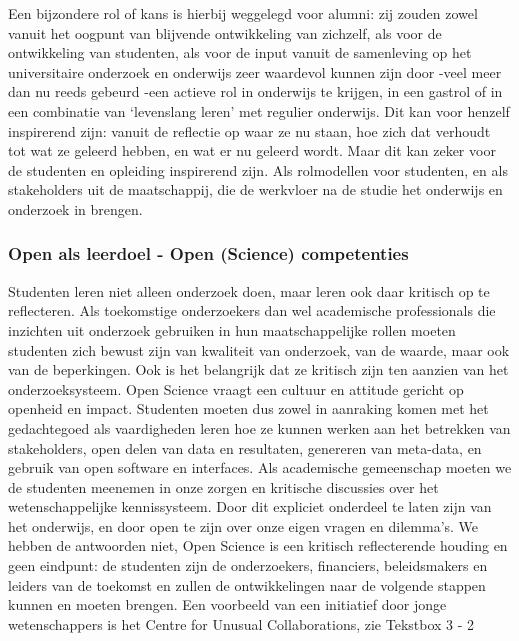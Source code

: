 \documentclass{jote-book}
\begin{document}
	Een bijzondere rol of kans is hierbij weggelegd voor alumni: zij zouden zowel vanuit het oogpunt van blijvende ontwikkeling van zichzelf, als voor de ontwikkeling van studenten, als voor de input vanuit de samenleving op het universitaire onderzoek en onderwijs zeer waardevol kunnen zijn door -veel meer dan nu reeds gebeurd -een actieve rol in onderwijs te krijgen, in een gastrol of in een combinatie van ‘levenslang leren' met regulier onderwijs. Dit kan voor henzelf inspirerend zijn: vanuit de reflectie op waar ze nu staan, hoe zich dat verhoudt tot wat ze geleerd hebben, en wat er nu geleerd wordt. Maar dit kan zeker voor de studenten en opleiding inspirerend zijn. Als rolmodellen voor studenten, en als stakeholders uit de maatschappij, die de werkvloer na de studie het onderwijs en onderzoek in brengen.



	\subsubsection{Open als leerdoel - Open (Science) competenties}



	Studenten leren niet alleen onderzoek doen, maar leren ook daar kritisch op te reflecteren. Als toekomstige onderzoekers dan wel academische professionals die inzichten uit onderzoek gebruiken in hun maatschappelijke rollen moeten studenten zich bewust zijn van kwaliteit van onderzoek, van de waarde, maar ook van de beperkingen. Ook is het belangrijk dat ze kritisch zijn ten aanzien van het onderzoeksysteem. Open Science vraagt een cultuur en attitude gericht op openheid en impact. Studenten moeten dus zowel in aanraking komen met het gedachtegoed als vaardigheden leren hoe ze kunnen werken aan het betrekken van stakeholders, open delen van data en resultaten, genereren van meta-data, en gebruik van open software en interfaces. Als academische gemeenschap moeten we de studenten meenemen in onze zorgen en kritische discussies over het wetenschappelijke kennissysteem. Door dit expliciet onderdeel te laten zijn van het onderwijs, en door open te zijn over onze eigen vragen en dilemma's. We hebben de antwoorden niet, Open Science is een kritisch reflecterende houding en geen eindpunt: de studenten zijn de onderzoekers, financiers, beleidsmakers en leiders van de toekomst en zullen de ontwikkelingen naar de volgende stappen kunnen en moeten brengen. Een voorbeeld van een initiatief door jonge wetenschappers is het Centre for Unusual Collaborations, zie Tekstbox 3 - 2
\end{document}
